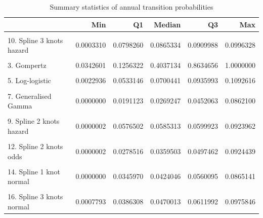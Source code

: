 \documentclass[
]{article}
\begin{document}
\begin{table}
\caption{\label{tab:validate_extrapolation1}Summary statistics of annual transition probabilities}
\begin{tabular}[t]{lrrrrr}
\toprule
  & Min & Q1 & Median & Q3 & Max\\
\midrule
\cellcolor{gray!6}{1. Exponential} & \cellcolor{gray!6}{0.0585969} & \cellcolor{gray!6}{0.0585969} & \cellcolor{gray!6}{0.0585969} & \cellcolor{gray!6}{0.0585969} & \cellcolor{gray!6}{0.0585969}\\
10. Spline 3 knots hazard & 0.0003310 & 0.0798260 & 0.0865334 & 0.0909988 & 0.0996328\\
\cellcolor{gray!6}{2. Weibull} & \cellcolor{gray!6}{0.0039603} & \cellcolor{gray!6}{0.1641779} & \cellcolor{gray!6}{0.2507544} & \cellcolor{gray!6}{0.3170901} & \cellcolor{gray!6}{0.3714738}\\
3. Gompertz & 0.0342601 & 0.1256322 & 0.4037134 & 0.8634656 & 1.0000000\\
\cellcolor{gray!6}{4. Log-normal} & \cellcolor{gray!6}{0.0000121} & \cellcolor{gray!6}{0.0563972} & \cellcolor{gray!6}{0.0670524} & \cellcolor{gray!6}{0.0819079} & \cellcolor{gray!6}{0.0936091}\\
5. Log-logistic & 0.0022936 & 0.0533146 & 0.0700441 & 0.0935993 & 0.1092616\\
\cellcolor{gray!6}{6. Gamma} & \cellcolor{gray!6}{0.0014181} & \cellcolor{gray!6}{0.1390361} & \cellcolor{gray!6}{0.1644882} & \cellcolor{gray!6}{0.1750195} & \cellcolor{gray!6}{0.1807519}\\
7. Generalised Gamma & 0.0000000 & 0.0191123 & 0.0269247 & 0.0452063 & 0.0862100\\
\cellcolor{gray!6}{8. Spline 1 knot hazard} & \cellcolor{gray!6}{0.0000002} & \cellcolor{gray!6}{0.0592140} & \cellcolor{gray!6}{0.0598953} & \cellcolor{gray!6}{0.0610195} & \cellcolor{gray!6}{0.0916043}\\
9. Spline 2 knots hazard & 0.0000002 & 0.0576502 & 0.0585313 & 0.0599923 & 0.0923962\\
\cellcolor{gray!6}{11. Spline 1 knot odds} & \cellcolor{gray!6}{0.0000002} & \cellcolor{gray!6}{0.0281269} & \cellcolor{gray!6}{0.0363823} & \cellcolor{gray!6}{0.0502992} & \cellcolor{gray!6}{0.0917044}\\
12. Spline 2 knots odds & 0.0000002 & 0.0278516 & 0.0359503 & 0.0497462 & 0.0924439\\
\cellcolor{gray!6}{13. Spline 3 knots odds} & \cellcolor{gray!6}{0.0003253} & \cellcolor{gray!6}{0.0358147} & \cellcolor{gray!6}{0.0466608} & \cellcolor{gray!6}{0.0638606} & \cellcolor{gray!6}{0.0999099}\\
14. Spline 1 knot normal & 0.0000000 & 0.0345970 & 0.0424046 & 0.0560095 & 0.0865141\\
\cellcolor{gray!6}{15. Spline 2 knots normal} & \cellcolor{gray!6}{0.0000006} & \cellcolor{gray!6}{0.0281480} & \cellcolor{gray!6}{0.0348987} & \cellcolor{gray!6}{0.0473455} & \cellcolor{gray!6}{0.0953359}\\
16. Spline 3 knots normal & 0.0007793 & 0.0386308 & 0.0470013 & 0.0611992 & 0.0975846\\
\bottomrule
\end{tabular}
\end{table}
\end{document}

